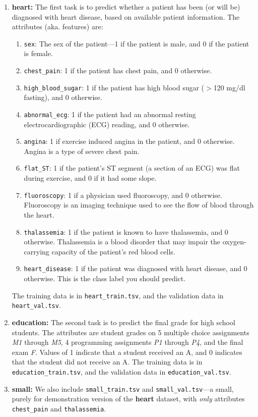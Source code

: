 \begin{enumerate}
\item \textbf{heart:}
    The first task is to predict whether a patient has been (or will be) diagnosed with heart disease, based on available patient information. The attributes (aka. features) are: 
    \begin{enumerate}
        \item \lstinline{sex}: The sex of the patient---1 if the patient is male, and 0 if the patient is female.
        \item \lstinline{chest_pain}: 1 if the patient has chest pain, and 0 otherwise.
        \item \lstinline{high_blood_sugar}: 1 if the patient has high blood sugar ($>$120 mg/dl fasting), and 0 otherwise.
        \item \lstinline{abnormal_ecg}: 1 if the patient had an abnormal resting electrocardiographic (ECG) reading, and 0 otherwise. 
        \item \lstinline{angina}: 1 if exercise induced angina in the patient, and 0 otherwise. Angina is a type of severe chest pain.
        \item \lstinline{flat_ST}: 1 if the patient's ST segment (a section of an ECG) was flat during exercise, and 0 if it had some slope.
        \item \lstinline{fluoroscopy}: 1 if a physician used fluoroscopy, and 0 otherwise. Fluoroscopy is an imaging technique used to see the flow of blood through the heart.
        \item \lstinline{thalassemia}: 1 if the patient is known to have thalassemia, and 0 otherwise. Thalassemia is a blood disorder that may impair the oxygen-carrying capacity of the patient's red blood cells.
        \item \lstinline{heart_disease}: 1 if the patient was diagnosed with heart disease, and 0 otherwise. This is the class label you should predict.
    \end{enumerate}
    The training data is in \lstinline{heart_train.tsv}, and the validation data in \lstinline{heart_val.tsv}.
\item \textbf{education:}
    The second task is to predict the final grade for high school students. The attributes are student grades on 5 multiple choice assignments \emph{M1} through \emph{M5}, 4 programming assignments \emph{P1} through \emph{P4}, and the final exam \emph{F}. Values of 1 indicate that a student received an A, and 0 indicates that the student did not receive an A. The training data is in \newline \lstinline{education_train.tsv}, and the validation data in \lstinline{education_val.tsv}.
\item \textbf{small:}
    We also include \lstinline{small_train.tsv} and \lstinline{small_val.tsv}---a small, purely for demonstration version of the \textbf{heart} dataset, with \emph{only} attributes \lstinline{chest_pain} and \lstinline{thalassemia}.  
\end{enumerate}

